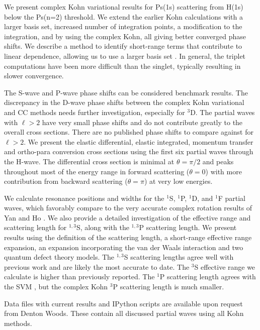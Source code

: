 \documentclass[preprint,showpacs,preprintnumbers,amsmath,amssymb,longbibliography,pra,aps]{revtex4-1}
\begin{document}
We present complex Kohn variational results for Ps(1s) scattering from H(1s) below the Ps(n=2) threshold. We extend the earlier Kohn calculations \cite{VanReeth2003,VanReeth2004} with a larger basis set, increased number of integration points, a modification to the integration, and by using the complex Kohn, all giving better converged phase shifts. We describe a method to identify short-range terms that contribute to linear dependence, allowing us to use a larger basis set \cite{Todd2007}. In general, the triplet computations have been more difficult than the singlet, typically resulting in slower convergence.

The S-wave and P-wave phase shifts can be considered benchmark results. The discrepancy in the D-wave phase shifts between the complex Kohn variational and CC methods needs further investigation, especially for $^3$D. The partial waves with $\ell > 2$ have very small phase shifts and do not contribute greatly to the overall cross sections. There are no published phase shifts to compare against for $\ell > 2$. We present the elastic differential, elastic integrated, momentum transfer and ortho-para conversion cross sections using the first six partial waves through the H-wave. The differential cross section is minimal at $\theta = \pi/2$ and peaks throughout most of the energy range in forward scattering ($\theta = 0$) with more contribution from backward scattering ($\theta = \pi$) at very low energies.

We calculate resonance positions and widths for the $^1$S, $^1$P, $^1$D, and $^1$F partial waves, which favorably compare to the very accurate complex rotation results of Yan and Ho \cite{Yan1999,Yan1998a,Ho1998,Ho2000}. We also provide a detailed investigation of the effective range and scattering length for $^{1,3}$S, along with the $^{1,3}$P scattering length. We present results using the definition of the scattering length, a short-range effective range expansion, an expansion incorporating the van der Waals interaction and two quantum defect theory models. The $^{1,3}$S scattering lengths agree well with previous work and are likely the most accurate to date. The $^3$S effective range we calculate is higher than previously reported. The $^1$P scattering length agrees with the SVM \cite{Ivanov2002}, but the complex Kohn $^3$P scattering length is much smaller.

Data files with current results and IPython scripts are available upon request from Denton Woods. These contain all discussed partial waves using all Kohn methods.
\end{document}
